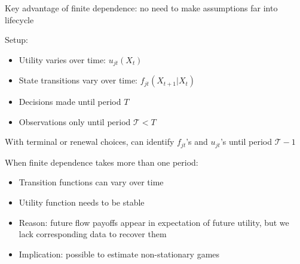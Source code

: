 \documentclass[aspectratio=169]{beamer}
\begin{document}
\begin{frame}

Key advantage of finite dependence: no need to make assumptions far into lifecycle

\bigskip

Setup:
\bigskip
\begin{itemize}
\itemsep1.5em
\item<2-> Utility varies over time: $u_{jt}(X_t)$
\item<3-> State transitions vary over time: $f_{jt}(X_{t+1}|X_t)$
\item<4-> Decisions made until period $T$
\item<5-> Observations only until period $\mathcal{T}<T$
\end{itemize}

\bigskip


\end{frame}





\begin{frame}

With terminal or renewal choices, can identify $f_{jt}$'s and $u_{jt}$'s until period $\mathcal{T}-1$

\bigskip



\end{frame}





\begin{frame}

When finite dependence takes more than one period:

\bigskip

\begin{itemize}
\itemsep1.5em
\item<2-> Transition functions can vary over time
\item<3-> Utility function needs to be stable
\item<4-> Reason: future flow payoffs appear in expectation of future utility, but we lack corresponding data to recover them
\item<5-> Implication: possible to estimate non-stationary games
\end{itemize}

\end{frame}
\end{document}
